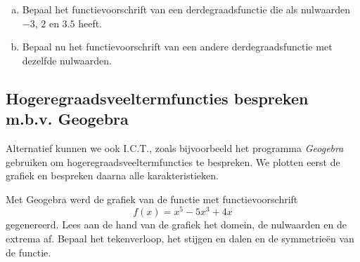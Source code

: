 \documentclass[12pt,twoside,a4paper]{article}
\begin{document}
\begin{oefening}
\begin{enumerate}[(a)]
  \item Bepaal het functievoorschrift van een derdegraadsfunctie die als nulwaarden $-3$, $2$ en $3.5$ heeft.
  \item Bepaal nu het functievoorschrift van een andere derdegraadsfunctie met dezelfde nulwaarden.
\end{enumerate}
\end{oefening}

\subsection{Hogeregraadsveeltermfuncties bespreken m.b.v. Geogebra}
Alternatief kunnen we ook I.C.T., zoals bijvoorbeeld het programma {\em Geogebra} gebruiken om hogeregraadsveeltermfuncties te bespreken. We plotten eerst de grafiek en bespreken daarna alle karakteristieken.

\begin{oefening}
  Met Geogebra werd de grafiek van de functie met functievoorschrift
  $$f(x)=x^5-5x^3+4x$$
  gegenereerd. Lees aan de hand van de grafiek het domein, de nulwaarden en de extrema af. Bepaal het tekenverloop, het stijgen en dalen en de symmetrieën van de functie.\\
  \begin{center}
  \end{center}
\end{oefening}
\end{document}
